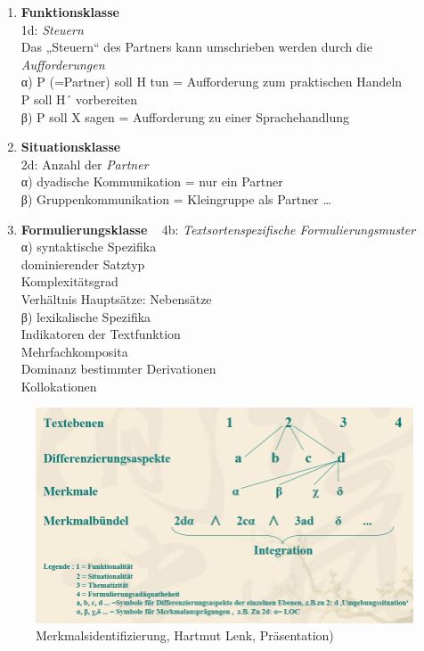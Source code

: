 \documentclass[
  letterpaper,
]{scrbook}
\begin{document}
\begin{enumerate}
\def\labelenumi{\arabic{enumi})}
\item
  \textbf{Funktionsklasse}\\
  1d: \emph{Steuern}\\
  Das „Steuern`` des Partners kann umschrieben werden durch die
  \emph{Aufforderungen}\\
  α) P (=Partner) soll H tun = Aufforderung zum praktischen Handeln\\
  P soll H´ vorbereiten\\
  β) P soll X sagen = Aufforderung zu einer Sprachehandlung\\
\item
  \textbf{Situationsklasse}\\
  2d: Anzahl der \emph{Partner}\\
  α) dyadische Kommunikation = nur ein Partner\\
  β) Gruppenkommunikation = Kleingruppe als Partner \ldots{}\\
\item
  \textbf{Formulierungsklasse} ~ 4b: \emph{Textsortenspezifische
  Formulierungsmuster}\\
  α) syntaktische Spezifika\\
  dominierender Satztyp\\
  Komplexitätsgrad\\
  Verhältnis Hauptsätze: Nebensätze\\
  β) lexikalische Spezifika\\
  Indikatoren der Textfunktion\\
  Mehrfachkomposita\\
  Dominanz bestimmter Derivationen\\
  Kollokationen ~
\end{enumerate}

\begin{figure}

{\centering \includegraphics[width=1\textwidth,height=\textheight]{./pictures/texterkmalidentifizierung.png}

}

\caption{Merkmalsidentifizierung, Hartmut Lenk, Präsentation)}

\end{figure}
\end{document}
